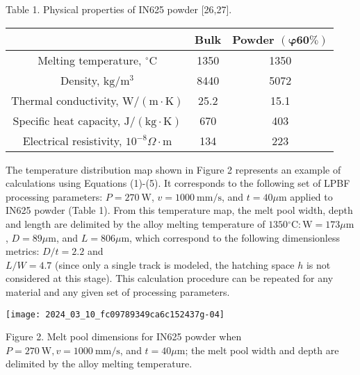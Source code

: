 \documentclass[10pt]{article}
\begin{document}
Table 1. Physical properties of IN625 powder [26,27].

\begin{center}
\begin{tabular}{ccc}
\hline
 & Bulk & Powder $(\boldsymbol{\varphi} \mathbf{6 0 \%})$ \\
\hline
Melting temperature, ${ }^{\circ} \mathrm{C}$ & 1350 & 1350 \\
Density, $\mathrm{kg} / \mathrm{m}^{3}$ & 8440 & 5072 \\
Thermal conductivity, $\mathrm{W} /(\mathrm{m} \cdot \mathrm{K})$ & 25.2 & 15.1 \\
Specific heat capacity, $\mathrm{J} /(\mathrm{kg} \cdot \mathrm{K})$ & 670 & 403 \\
Electrical resistivity, $10^{-8} \Omega \cdot \mathrm{m}$ & 134 & 223 \\
\hline
\end{tabular}
\end{center}

The temperature distribution map shown in Figure 2 represents an example of calculations using Equations (1)-(5). It corresponds to the following set of LPBF processing parameters: $P=270 \mathrm{~W}$, $v=1000 \mathrm{~mm} / \mathrm{s}$, and $t=40 \mu \mathrm{m}$ applied to IN625 powder (Table 1). From this temperature map, the melt pool width, depth and length are delimited by the alloy melting temperature of $1350{ }^{\circ} \mathrm{C}: \mathrm{W}=173 \mu \mathrm{m}$, $D=89 \mu \mathrm{m}$, and $L=806 \mu \mathrm{m}$, which correspond to the following dimensionless metrics: $D / t=2.2$ and\\
$L / W=4.7$ (since only a single track is modeled, the hatching space $h$ is not considered at this stage). This calculation procedure can be repeated for any material and any given set of processing parameters.

\begin{center}
\texttt{[image: 2024\_03\_10\_fc09789349ca6c152437g-04]}
\end{center}

Figure 2. Melt pool dimensions for IN625 powder when $P=270 \mathrm{~W}, v=1000 \mathrm{~mm} / \mathrm{s}$, and $t=40 \mu \mathrm{m}$; the melt pool width and depth are delimited by the alloy melting temperature.
\end{document}
